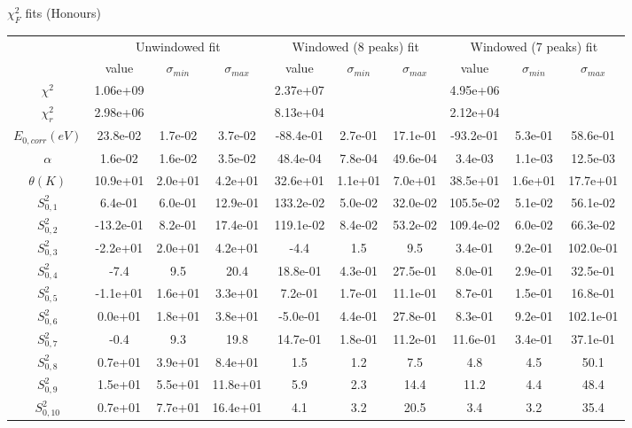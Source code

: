 \documentclass{article}
\begin{document}
\begin{landscape}
\begin{table}[ht]
\centering
$\chi^2_F$ fits (Honours)

\begin{tabular}{c|c|c|c|c|c|c|c|c|c}
\hline
&\multicolumn{3}{|c}{Unwindowed fit}&\multicolumn{3}{|c}{Windowed (8 peaks) fit}&\multicolumn{3}{|c}{Windowed (7 peaks) fit}\\
& value & $\sigma_{min}$ & $\sigma_{max}$& value & $\sigma_{min}$ & $\sigma_{max}$& value & $\sigma_{min}$ & $\sigma_{max}$\\
\hline
$\chi^2$   & 1.06e+09 & & & 2.37e+07 & & & 4.95e+06 & & \\
$\chi^2_r$ & 2.98e+06 & & & 8.13e+04 & & & 2.12e+04 & & \\
\hline
$E_{0,corr} (eV)$& 23.8e-02 & 1.7e-02 & 3.7e-02 & -88.4e-01 & 2.7e-01 & 17.1e-01 & -93.2e-01 & 5.3e-01 & 58.6e-01 \\
$\alpha $       & 1.6e-02 & 1.6e-02 & 3.5e-02 & 48.4e-04 & 7.8e-04 & 49.6e-04 & 3.4e-03 & 1.1e-03 & 12.5e-03 \\
$\theta (K) $   & 10.9e+01 & 2.0e+01 & 4.2e+01 & 32.6e+01 & 1.1e+01 & 7.0e+01 & 38.5e+01 & 1.6e+01 & 17.7e+01 \\
$S^2_{0,1}$& 6.4e-01 & 6.0e-01 & 12.9e-01 & 133.2e-02 & 5.0e-02 & 32.0e-02 & 105.5e-02 & 5.1e-02 & 56.1e-02 \\
$S^2_{0,2}$& -13.2e-01 & 8.2e-01 & 17.4e-01 & 119.1e-02 & 8.4e-02 & 53.2e-02 & 109.4e-02 & 6.0e-02 & 66.3e-02 \\
$S^2_{0,3}$& -2.2e+01 & 2.0e+01 & 4.2e+01 & -4.4 & 1.5 & 9.5 & 3.4e-01 & 9.2e-01 & 102.0e-01 \\
$S^2_{0,4}$& -7.4 & 9.5 & 20.4 & 18.8e-01 & 4.3e-01 & 27.5e-01 & 8.0e-01 & 2.9e-01 & 32.5e-01 \\
$S^2_{0,5}$& -1.1e+01 & 1.6e+01 & 3.3e+01 & 7.2e-01 & 1.7e-01 & 11.1e-01 & 8.7e-01 & 1.5e-01 & 16.8e-01 \\
$S^2_{0,6}$& 0.0e+01 & 1.8e+01 & 3.8e+01 & -5.0e-01 & 4.4e-01 & 27.8e-01 & 8.3e-01 & 9.2e-01 & 102.1e-01 \\
$S^2_{0,7}$& -0.4 & 9.3 & 19.8 & 14.7e-01 & 1.8e-01 & 11.2e-01 & 11.6e-01 & 3.4e-01 & 37.1e-01 \\
$S^2_{0,8}$& 0.7e+01 & 3.9e+01 & 8.4e+01 & 1.5 & 1.2 & 7.5 & 4.8 & 4.5 & 50.1 \\
$S^2_{0,9}$& 1.5e+01 & 5.5e+01 & 11.8e+01 & 5.9 & 2.3 & 14.4 & 11.2 & 4.4 & 48.4 \\
$S^2_{0,10}$& 0.7e+01 & 7.7e+01 & 16.4e+01 & 4.1 & 3.2 & 20.5 & 3.4 & 3.2 & 35.4 \\

\end{tabular}
\end{table}
\end{landscape}
\end{document}
